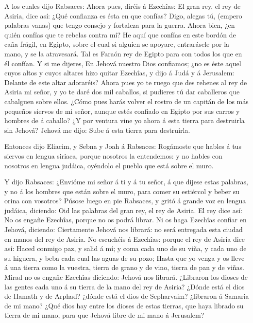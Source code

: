  A los cuales dijo Rabsaces: Ahora pues, diréis á Ezechîas:
El gran rey, el rey de Asiria, dice así: ¿Qué confianza es ésta en que
confías?  Digo, alegas tú, (empero palabras vanas) que tengo
consejo y fortaleza para la guerra. Ahora bien, ¿en quién confías que te
rebelas contra mí?  He aquí que confías en este bordón de
caña frágil, en Egipto, sobre el cual si alguien se apoyare, entrarásele
por la mano, y se la atravesará. Tal es Faraón rey de Egipto para con
todos los que en él confían.  Y si me dijeres, En Jehová
nuestro Dios confiamos; ¿no es éste aquel cuyos altos y cuyos altares
hizo quitar Ezechîas, y dijo á Judá y á Jerusalem: Delante de este altar
adoraréis?  Ahora pues yo te ruego que des rehenes al rey de
Asiria mi señor, y yo te daré dos mil caballos, si pudieres tú dar
caballeros que cabalguen sobre ellos.  ¿Cómo pues harás
volver el rostro de un capitán de los más pequeños siervos de mi señor,
aunque estés confiado en Egipto por sus carros y hombres de á caballo?
 ¿Y por ventura vine yo ahora á esta tierra para destruirla
sin Jehová? Jehová me dijo: Sube á esta tierra para destruirla.

 Entonces dijo Eliacim, y Sebna y Joah á Rabsaces:
Rogámoste que hables á tus siervos en lengua siriaca, porque nosotros la
entendemos: y no hables con nosotros en lengua judáica, oyéndolo el
pueblo que está sobre el muro.

 Y dijo Rabsaces: ¿Envióme mi señor á ti y á tu señor, á
que dijese estas palabras, y no á los hombres que están sobre el muro,
para comer su estiércol y beber su orina con vosotros? 
Púsose luego en pie Rabsaces, y gritó á grande voz en lengua judáica,
diciendo: Oid las palabras del gran rey, el rey de Asiria. 
El rey dice así: No os engañe Ezechîas, porque no os podrá librar.
 Ni os haga Ezechîas confiar en Jehová, diciendo:
Ciertamente Jehová nos librará: no será entregada esta ciudad en manos
del rey de Asiria.  No escuchéis á Ezechîas: porque el rey
de Asiria dice así: Haced conmigo paz, y salid á mí; y coma cada uno de
su viña, y cada uno de su higuera, y beba cada cual las aguas de su
pozo;  Hasta que yo venga y os lleve á una tierra como la
vuestra, tierra de grano y de vino, tierra de pan y de viñas.
 Mirad no os engañe Ezechîas diciendo: Jehová nos librará.
¿Libraron los dioses de las gentes cada uno á su tierra de la mano del
rey de Asiria?  ¿Dónde está el dios de Hamath y de Arphad?
¿dónde está el dios de Sepharvaim? ¿libraron á Samaria de mi mano?
 ¿Qué dios hay entre los dioses de estas tierras, que haya
librado su tierra de mi mano, para que Jehová libre de mi mano á
Jerusalem?

